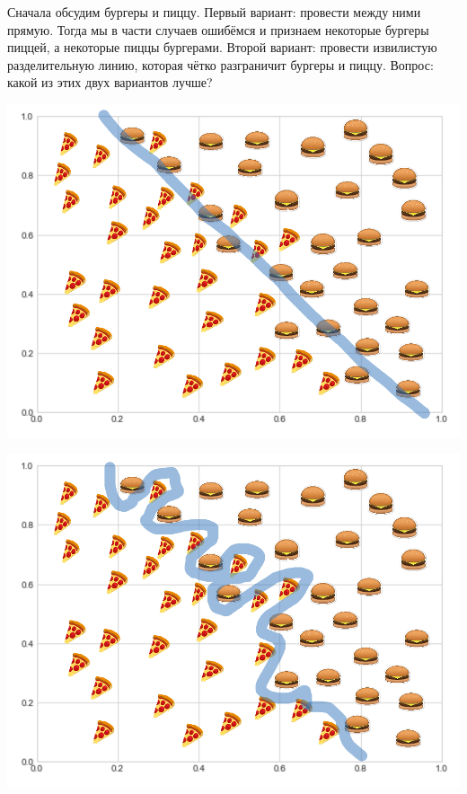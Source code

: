\documentclass[12pt, a4paper, oneside]{article}
\theoremstyle{plain} %
\theoremstyle{definition}
\begin{document}
\begin{solution}
Сначала обсудим бургеры и пиццу.  Первый вариант: провести между ними прямую. Тогда мы в части случаев ошибёмся и признаем некоторые бургеры пиццей, а некоторые пиццы бургерами. Второй вариант: провести извилистую разделительную линию, которая чётко разграничит бургеры и пиццу. Вопрос: какой из этих двух вариантов лучше?
	
\begin{minipage}[t]{0.45\textwidth}
	\includegraphics[scale=0.21]{class_1_res1.png}
\end{minipage}
\hfill
\begin{minipage}[t]{0.45\textwidth}
	\includegraphics[scale=0.21]{class_1_res2.png}
\end{minipage}
	

\end{solution}
\end{document}
